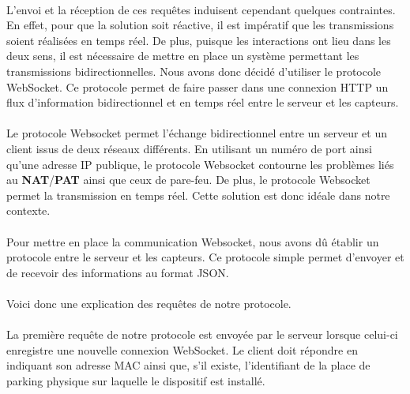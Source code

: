 \paragraph*{}
L'envoi et la réception de ces requêtes induisent cependant quelques contraintes. En effet, pour que la solution soit réactive, il est impératif que les transmissions soient réalisées en temps réel. De plus, puisque les interactions ont lieu dans les deux sens, il est nécessaire de mettre en place un système permettant les transmissions bidirectionnelles. Nous avons donc décidé d'utiliser le protocole WebSocket. Ce protocole permet de faire passer dans une connexion HTTP un flux d'information bidirectionnel et en temps réel entre le serveur et les capteurs. 

\paragraph*{}
Le protocole Websocket permet l'échange bidirectionnel entre un serveur et un client issus de deux réseaux différents. En utilisant un numéro de port ainsi qu'une adresse IP publique, le protocole Websocket contourne les problèmes liés au \textbf{NAT}/\textbf{PAT} ainsi que ceux de pare-feu. De plus, le protocole Websocket permet la transmission en temps réel. Cette solution est donc idéale dans notre contexte.

\paragraph*{}
Pour mettre en place la communication Websocket, nous avons dû établir un protocole entre le serveur et les capteurs. Ce protocole simple permet d'envoyer et de recevoir des informations au format JSON.


\paragraph*{}
Voici donc une explication des requêtes de notre protocole.

\clearpage

\paragraph*{}
La première requête de notre protocole est envoyée par le serveur lorsque celui-ci enregistre une nouvelle connexion WebSocket. Le client doit répondre en indiquant son adresse MAC ainsi que, s'il existe, l'identifiant de la place de parking physique sur laquelle le dispositif est installé.

